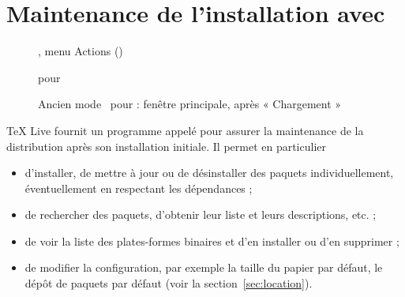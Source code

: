 \documentclass[german, english, french]{article}
\renewcommand{\TL}{\TeX{} Live\xspace}%
\begin{document}
%

\section{Maintenance de l'installation avec }
\label{sec:tlmgr}

\begin{figure}[tb]
  \caption{\GUI{} , menu Actions (\MacOSX)}
  \label{fig:tlshell}
\end{figure}

\begin{figure}[tb]
  \caption{\GUI{}  pour }
  \label{fig:tlcockpit}
\end{figure}

\begin{figure}[tb]
  \caption{Ancien mode \GUI\ pour : fenêtre principale, après
    « Chargement »}
  \label{fig:tlmgr-gui}
\end{figure}

\TL fournit un programme appelé  pour assurer la maintenance de la
distribution après son installation initiale. Il permet en particulier
\begin{itemize}
\item d'installer, de mettre à jour ou de désinstaller des paquets
  individuellement, éventuellement en respectant les dépendances ;
\item de rechercher des paquets, d'obtenir leur liste et leurs descriptions,
  etc. ;
\item de voir la liste des plates-formes binaires et d'en installer ou d'en
  supprimer ;
\item de modifier la configuration, par exemple la taille du papier par défaut,
  le dépôt de paquets par défaut (voir la section~\ref{sec:location}).
\end{itemize}
\end{document}
